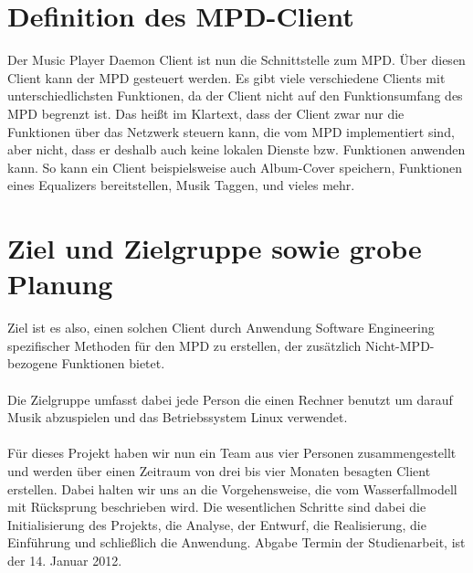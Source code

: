 \newpage
\section{Definition des MPD-Client}
Der Music Player Daemon Client ist nun die Schnittstelle zum MPD. Über diesen Client kann der MPD gesteuert werden. Es gibt viele verschiedene Clients mit unterschiedlichsten Funktionen, da der Client nicht auf den Funktionsumfang des MPD begrenzt ist. Das heißt im Klartext, dass der Client zwar nur die Funktionen über das Netzwerk steuern kann, die vom MPD implementiert sind, aber nicht, dass er deshalb auch keine lokalen Dienste bzw. Funktionen anwenden kann. So kann ein Client beispielsweise auch Album-Cover speichern, Funktionen eines Equalizers bereitstellen, Musik Taggen, und vieles mehr.

\section{Ziel und Zielgruppe sowie grobe Planung}
Ziel ist es also, einen solchen Client durch Anwendung Software Engineering spezifischer Methoden für den MPD zu erstellen, der zusätzlich Nicht-MPD-bezogene Funktionen bietet. 
\ \\ \\
Die Zielgruppe umfasst dabei jede Person die einen Rechner benutzt um darauf Musik abzuspielen und das Betriebssystem Linux verwendet.
\ \\ \\
Für dieses Projekt haben wir nun ein Team aus vier Personen zusammengestellt und werden über einen Zeitraum von drei bis vier Monaten besagten Client erstellen. Dabei halten wir uns an die Vorgehensweise, die vom Wasserfallmodell mit Rücksprung beschrieben wird. Die wesentlichen Schritte sind dabei die Initialisierung des Projekts, die Analyse, der Entwurf, die Realisierung, die Einführung und schließlich die Anwendung. Abgabe Termin der Studienarbeit, ist der 14. Januar 2012.
